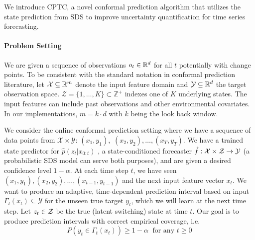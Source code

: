 We introduce CPTC, a novel conformal prediction algorithm that utilizes the state prediction from SDS to improve uncertainty quantification for time series forecasting.
\vspace{-0.5em}
\paragraph{Problem Setting}
We are given a sequence of observations $o_t \in \mathbb{R}^d$ for all $t$ potentially with  change points.
To be consistent with the standard notation in conformal prediction literature, let 
$\mathcal{X} \subseteq \mathbb{R}^{m}$ denote the input feature domain and $\mathcal{Y} \subseteq \mathbb{R}^d$ the target observation space. $ \mathcal{Z} = \{1, \dots, K\} \subset \mathbb{Z}^+$ indexes one of $K$ underlying states. The input features can include past observations and other environmental covariates.  In our implementations, $m = k \cdot d$ with $k$ being the look back window.

We consider the online conformal prediction setting where we have a sequence of data points from $\mathcal{X} \times \mathcal{Y}$: $(x_1, y_1), $ $(x_2, y_2), \ldots, (x_T , y_T )$. We have a trained state predictor for $\hat{p}(z_t|x_{0:t})$ , a state-conditioned forecaster $\hat{f}:{\mathcal{X}} \times {\mathcal{Z}} \to {\mathcal{Y}}$ (a probabilistic SDS model can serve both purposes), and are given a desired confidence level $1-\alpha$. At each time step $t$, we have seen $(x_1, y_1),(x_2, y_2), \ldots,(x_{t-1} , y_{t-1} )$ and the next input feature vector $x_t$. We want to produce an adaptive, time-dependent prediction interval based on input $\Gamma_t(x_t) \subseteq \mathcal{Y}$ for the unseen true target $y_t$, which we will learn at the next time step. Let $z_t \in {\mathcal{Z}}$ be the true (latent switching) state at time $t$. %
Our goal is to produce prediction intervals with correct empirical coverage, i.e.    
\vspace{-0.2em}
\begin{equation}
    P (y_t \in \Gamma_t(x_t)) \geq 1-\alpha \; \text{ for any } t\geq 0
    \label{eq:goal}
\end{equation}
\vspace{-2em}
